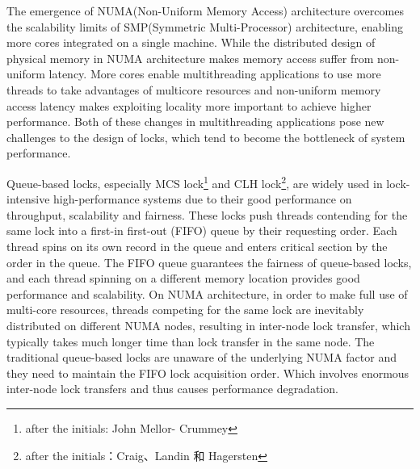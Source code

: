 \begin{englishabstract}
The emergence of NUMA(Non-Uniform Memory Access) architecture overcomes the scalability limits of SMP(Symmetric Multi-Processor) architecture, enabling more cores integrated on a single machine. While the distributed design of physical memory in NUMA architecture makes memory access suffer from non-uniform latency. More cores enable multithreading applications to use more threads to take advantages of multicore resources and non-uniform memory access latency makes exploiting locality more important to achieve higher performance. Both of these changes in multithreading applications pose new challenges to the design of locks, which tend to become the bottleneck of system performance.

Queue-based locks, especially MCS lock\footnote{after the initials: John Mellor-
Crummey} and CLH lock\footnote{after the initials：Craig、Landin 和 Hagersten}, are widely used in lock-intensive high-performance systems due to their good performance on throughput, scalability and fairness. These locks push threads contending for the same lock into a first-in first-out (FIFO) queue by their requesting order. Each thread spins on its own record in the queue and enters critical section by the order in the queue. The FIFO queue guarantees the fairness of queue-based locks, and each thread spinning on a different memory location provides good performance and scalability. On NUMA architecture, in order to make full use of multi-core resources, threads competing for the same lock are inevitably distributed on different NUMA nodes, resulting in inter-node lock transfer, which typically takes much longer time than lock transfer in the same node. The traditional queue-based locks are unaware of  the underlying NUMA factor and they need to maintain the FIFO lock acquisition order. Which involves enormous inter-node lock transfers and thus causes performance degradation.



\end{englishabstract}
